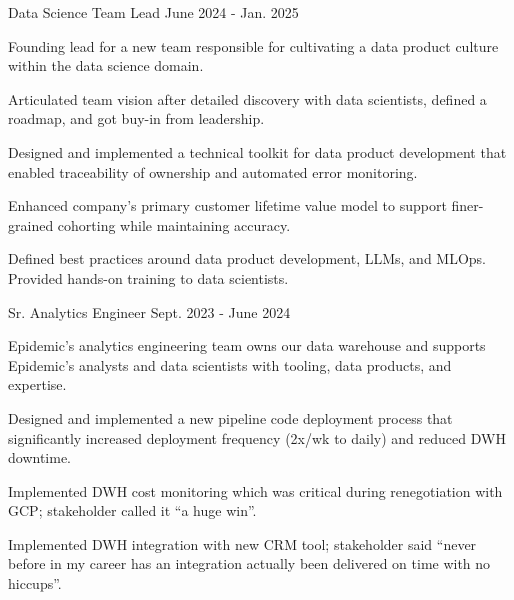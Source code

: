 \begin{cventries}
  \vspace{-1.0mm}
  \cventry
    {Data Science Team Lead} %
    {} %
    {} %
    {June 2024 - Jan. 2025} %
    {
    Founding lead for a new team responsible for cultivating a data product culture within the data science domain.
    \vspace{5.0mm}
      \begin{cvitems} %
        \item {Articulated team vision after detailed discovery with data scientists, defined a roadmap, and got buy-in from leadership. }
        \item {Designed and implemented a technical toolkit for data product development that enabled traceability of ownership and automated error monitoring. }
        \item {Enhanced company's primary customer lifetime value model to support finer-grained cohorting while maintaining accuracy. }
        \item {Defined best practices around data product development, LLMs, and MLOps. Provided hands-on training to data scientists. }
      \end{cvitems}
    }

  \vspace{-1.0mm}
  \cventry
    {Sr. Analytics Engineer} %
    {} %
    {} %
    {Sept. 2023 - June 2024} %
    {
    Epidemic's analytics engineering team owns our data warehouse and supports Epidemic's analysts
    and data scientists with tooling, data products, and expertise.
    \vspace{5.0mm}
      \begin{cvitems} %
        \item {Designed and implemented a new pipeline code deployment process that significantly increased deployment frequency (2x/wk to daily) and reduced DWH downtime.}
        \item {Implemented DWH cost monitoring which was critical during renegotiation with GCP; stakeholder called it “a huge win”.}
        \item {Implemented DWH integration with new CRM tool; stakeholder said “never before in my career has an integration actually been delivered on time with no hiccups”.}
      \end{cvitems}
    }




\end{cventries}
